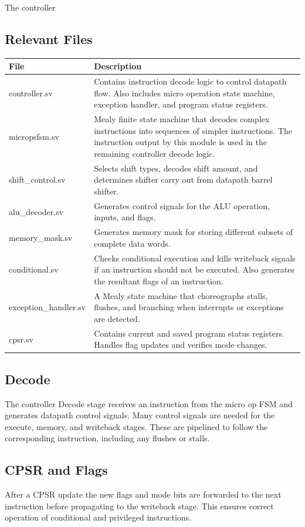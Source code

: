 \label{sec:c}
The controller

\subsection{Relevant Files}
\begin{tabular}{|l|p{120mm}|}
\hline \textbf{File}  & \textbf{Description} \\ 
\hline controller.sv & Contains instruction decode logic to control datapath flow. Also includes micro operation state machine, exception handler, and program status registers.\\ 
\hline micropsfsm.sv & Mealy finite state machine that decodes complex instructions into sequences of simpler instructions. The instruction output by this module is used in the remaining controller decode logic.\\ 
\hline shift\_control.sv & Selects shift types, decodes shift amount, and determines shifter carry out from datapath barrel shifter. \\ 
\hline alu\_decoder.sv & Generates control signals for the ALU operation, inputs, and flags.\\
\hline memory\_mask.sv & Generates memory mask for storing different subsets of complete data words. \\
\hline conditional.sv & Checks conditional execution and kills writeback signals if an instruction should not be executed. Also generates the resultant flags of an instruction.\\
\hline exception\_handler.sv & A Mealy state machine that choreographs stalls, flushes, and branching when interrupts or exceptions are detected.\\
\hline cpsr.sv & Contains current and saved program status registers. Handles flag updates and verifies mode changes. \\
\hline 
\end{tabular} 


\subsection{Decode}
The controller Decode stage receives an instruction from the micro op FSM and generates datapath control signals.
Many control signals are needed for the execute, memory, and writeback stages. 
These are pipelined to follow the corresponding instruction, including any flushes or stalls.

\subsection{CPSR and Flags}
After a CPSR update the new flags and mode bits are forwarded to the next instruction before propagating to the writeback stage. 
This ensures correct operation of conditional and privileged instructions.

